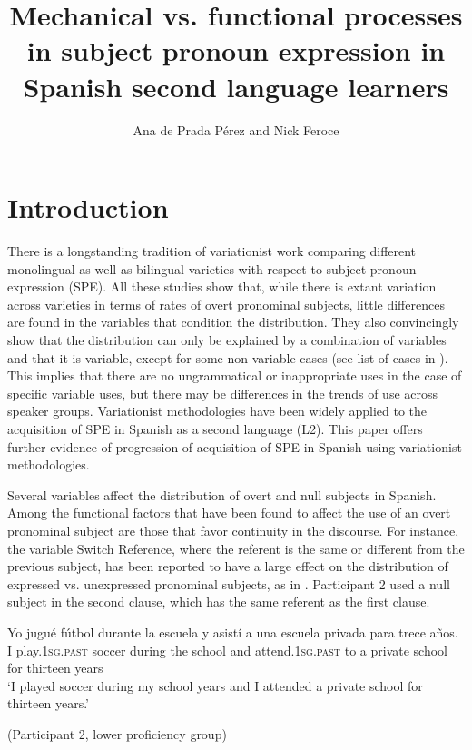 \documentclass[output=paper,colorlinks,citecolor=brown,draftmode]{langscibook}
\author{Ana {de Prada Pérez}\affiliation{Maynooth University}\orcid{0000-0003-4153-9638} and Nick Feroce\affiliation{Lexia Learning}\orcid{0000-0001-7615-0820}}
\title{Mechanical vs. functional processes in subject pronoun expression in Spanish second language learners}
\begin{document}
\maketitle

\section{Introduction}
There is a longstanding tradition of variationist work comparing different monolingual as well as bilingual varieties with respect to subject pronoun expression (SPE). All these studies show that, while there is extant variation across varieties in terms of rates of overt pronominal subjects, little differences are found in the variables that condition the distribution. They also convincingly show that the distribution can only be explained by a combination of variables and that it is variable, except for some non-variable cases (see list of cases in  \citealt[33--36]{Cameron1997}). This implies that there are no ungrammatical or inappropriate uses in the case of specific variable uses, but there may be differences in the trends of use across speaker groups. Variationist methodologies have been widely applied to the acquisition of SPE in Spanish as a second language (L2). This paper offers further evidence of progression of acquisition of SPE in Spanish using variationist methodologies.

Several variables affect the distribution of overt and null subjects in Spanish. Among the functional factors that have been found to affect the use of an overt pronominal subject are those that favor continuity in the discourse. For instance, the variable Switch Reference, where the referent is the same or different from the previous subject, has been reported to have a large effect on the distribution of expressed vs. unexpressed pronominal subjects, as in . Participant 2 used a null subject in the second clause, which has the same referent as the first clause.


\ea\label{ex:14:1}
\gll Yo jugué fútbol durante la escuela y asistí a una escuela privada para trece años.\\
     I play.\textsc{1sg}.\textsc{past} soccer during the school and attend.\textsc{1sg}.\textsc{past} to a private school for thirteen years\\
\glt ‘I played soccer during my school years and I attended a private school for thirteen years.'
\begin{flushright}
(Participant 2, lower proficiency group)
\end{flushright}
\z
{} %
\end{document}
